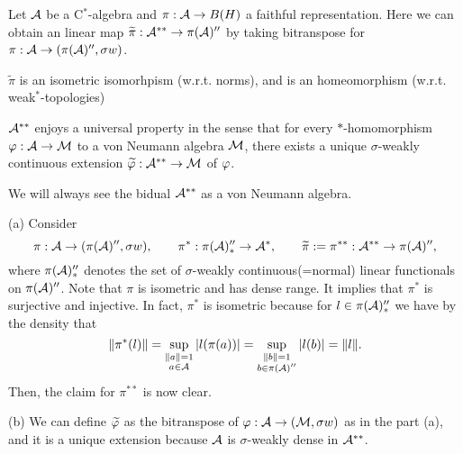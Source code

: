 \documentclass{../../small}
\begin{document}
\begin{thm}
Let $\mathcal{A}$ be a C$^*$-algebra and $\pi:\mathcal{A}\to B(H)$ a faithful representation.
Here we can obtain an linear map $\widetilde\pi:\mathcal{A}^{**}\to\pi(\mathcal{A})''$ by taking bitranspose for $\pi:\mathcal{A}\to(\pi(\mathcal{A})'',\sigma w)$.
\begin{parts}
\item $\tilde\pi$ is an isometric isomorhpism (w.r.t. norms), and is an homeomorphism (w.r.t. weak$^*$-topologies)
\item $\mathcal{A}^{**}$ enjoys a universal property in the sense that for every $*$-homomorphism $\varphi:\mathcal{A}\to\mathcal{M}$ to a von Neumann algebra $\mathcal{M}$, there exists a unique $\sigma$-weakly continuous extension $\widetilde{\varphi}:\mathcal{A}^{**}\to\mathcal{M}$ of $\varphi$.
\end{parts}
We will always see the bidual $\mathcal{A}^{**}$ as a von Neumann algebra.
\end{thm}
\begin{pf}
(a)
Consider
\[\pi:\mathcal{A}\to(\pi(\mathcal{A})'',\sigma w),\qquad\pi^*:\pi(\mathcal{A})''_*\to\mathcal{A}^*,\qquad\widetilde\pi:=\pi^{**}:\mathcal{A}^{**}\to\pi(\mathcal{A})'',\]
where $\pi(\mathcal{A})''_*$ denotes the set of $\sigma$-weakly continuous(=normal) linear functionals on $\pi(\mathcal{A})''$.
Note that $\pi$ is isometric and has dense range.
It implies that $\pi^*$ is surjective and injective.
In fact, $\pi^*$ is isometric because for $l\in\pi(\mathcal{A})''_*$ we have by the density that
\[\|\pi^*(l)\|=\sup_{\substack{\|a\|=1\\a\in\mathcal{A}}}|l(\pi(a))|=\sup_{\substack{\|b\|=1\\b\in\pi(\mathcal{A})''}}|l(b)|=\|l\|.\]
Then, the claim for $\pi^{**}$ is now clear.

(b)
We can define $\widetilde{\varphi}$ as the bitranspose of $\varphi:\mathcal{A}\to(\mathcal{M},\sigma w)$ as in the part (a), and it is a unique extension because $\mathcal{A}$ is $\sigma$-weakly dense in $\mathcal{A}^{**}$.
\end{pf}
\end{document}

